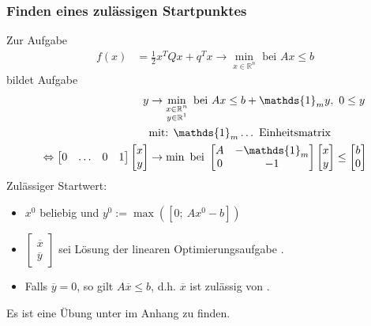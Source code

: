 \subsubsection{Finden eines zulässigen Startpunktes}
Zur Aufgabe 
\begin{align}
	f(x) & =\frac12 x^TQx+q^Tx\rightarrow\min\limits_{x\in\mathbb{R}^n} \text{ bei } Ax\le b \label{eq:startpkt_1}
\end{align} 
bildet Aufgabe 
\begin{align}
	y & \rightarrow\min\limits_{\substack{x\in\mathbb{R}^n\\y\in\mathbb{R}^1}} \text{ bei } Ax\le b+\mathds{1}_m y,\ 0\le y \label{eq:startpkt_2}\\
	& \text{mit: } \mathds{1}_m\ldots \text{ Einheitsmatrix} \notag\\
	\Leftrightarrow \begin{bmatrix} 0 & \ldots & 0 & 1 \end{bmatrix}\begin{bmatrix} x\\y \end{bmatrix} & \rightarrow\min  \text{ bei } \begin{bmatrix} A & -\mathds{1}_m\\0 & -1
	\end{bmatrix}\begin{bmatrix} x\\y \end{bmatrix}\le \begin{bmatrix} b\\0 \end{bmatrix} \label{eq:startpkt_3}
\end{align}
Zulässiger Startwert:
\begin{itemize}
  \item[] $x^0$ beliebig und $y^0:=\max\left([0;\ Ax^0-b]\right)$
  \item[] $\begin{bmatrix}\overline{x}\\ \overline{y} \end{bmatrix}$ sei Lösung der linearen Optimierungsaufgabe .
  \item[] Falls $\overline{y}=0$, so gilt 
  $A\overline{x}\le b$, d.h. $\overline{x}$ ist zulässig von .
\end{itemize}
Es ist eine Übung unter  im Anhang zu finden.


